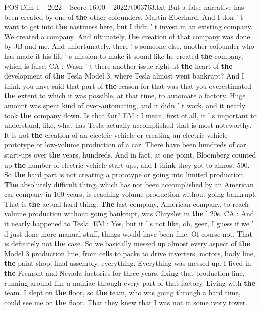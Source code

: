 \begin{textsample}{POS Dim 1 – 2022 – Score 16.00 – 2022/t003763.txt}
But a false narrative has been created by one of \textbf{the} other cofounders, Martin Eberhard.
And I don ' t want to get into \textbf{the} nastiness here, but I didn ' t invest in an existing company.
We created a company.
And ultimately, \textbf{the} creation of that company was done by JB and me.
And unfortunately, there ' s someone else, another cofounder who has made it his life ' s mission to make it sound like he created \textbf{the} company, which is false.
CA : Wasn ' t there another issue right at \textbf{the} heart of \textbf{the} development of \textbf{the} Tesla Model 3, where Tesla almost went bankrupt?
And I think you have said that part of \textbf{the} reason for that was that you overestimated \textbf{the} extent to which it was possible, at that time, to automate a factory.
Huge amount was spent kind of over-automating, and it didn ' t work, and it nearly took \textbf{the} company down.
Is that fair?
EM : I mean, first of all, it ' s important to understand, like, what has Tesla actually accomplished that is most noteworthy.
It is not \textbf{the} creation of an electric vehicle or creating an electric vehicle prototype or low-volume production of a car.
There have been hundreds of car start-ups over \textbf{the} years, hundreds.
And in fact, at one point, Bloomberg counted up \textbf{the} number of electric vehicle start-ups, and I think they got to almost 500.
So \textbf{the} hard part is not creating a prototype or going into limited production. \textbf{The} absolutely difficult thing, which has not been accomplished by an American car company in 100 years, is reaching volume production without going bankrupt.
That is \textbf{the} actual hard thing. \textbf{The} last company, American company, to reach volume production without going bankrupt, was Chrysler in \textbf{the} ' 20s.
CA : And it nearly happened to Tesla.
EM : Yes, but it ' s not like, oh, geez, I guess if we ' d just done more manual stuff, things would have been fine.
Of course not.
That is definitely not \textbf{the} case.
So we basically messed up almost every aspect of \textbf{the} Model 3 production line, from cells to packs to drive inverters, motors, body line, \textbf{the} paint shop, final assembly, everything.
Everything was messed up.
I lived in \textbf{the} Fremont and Nevada factories for three years, fixing that production line, running around like a maniac through every part of that factory.
Living with \textbf{the} team.
I slept on \textbf{the} floor, so \textbf{the} team, who was going through a hard time, could see me on \textbf{the} floor.
That they knew that I was not in some ivory tower.

\end{textsample}
